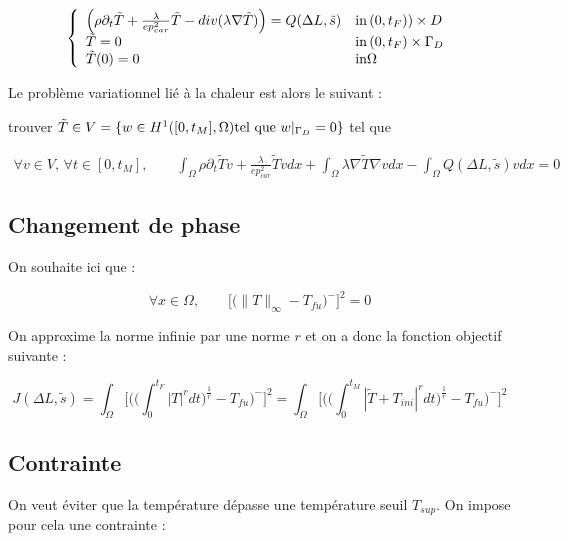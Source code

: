 \documentclass[11pt,a4paper]{article}
\begin{document}
\begin{equation}
\label{eq:ChaleurTilde}
\left\{\begin{array}{ll}
\Big(\rho\partial_t \tilde{T}+\frac{\lambda}{ep_{car}^2} \tilde{T}-div(\lambda\nabla \tilde{T})\Big)=Q(\Delta L,\tilde{s})& \textrm{in\,}(0,t_F))\times D \\
\tilde{T}=0 & \textrm{in\,}(0,t_F)\times \Gamma_D \\
\tilde{T}(0)=0 & \textrm{in} \Omega
\end{array}\right.
\end{equation}




Le problème variationnel lié à la chaleur est alors le suivant :

trouver $\tilde{T}\in V=\{w\in H^1([0,t_M],\Omega) \textrm{tel\,\,que} \,\,w|_{\Gamma_D}=0\}$ tel que

\begin{equation}
\label{eq:pbVarChaleurTF}
\begin{aligned}
\forall v\in V,\,\forall t\in[0,t_M], \qquad\int_{\Omega}\rho\partial_t \tilde{T}v+\frac{\lambda}{ep_{car}^2} \tilde{T}v dx+\int_{\Omega}\lambda\nabla \tilde{T}\nabla vdx-\int_{\Omega}Q(\Delta L,\tilde{s})vdx=0
\end{aligned} 
\end{equation}

\subsection*{Changement de phase}
On souhaite ici que :

\begin{equation}
\forall x\in\Omega,\qquad \Big[\Big(\|T\|_{\infty}-T_{fu}\Big)^-\Big]^2=0
\end{equation}

On approxime la norme infinie par une norme $r$ et on a donc la fonction objectif suivante :

\begin{equation}
J(\Delta L,\tilde{s})=\int_{\Omega}\Bigg[\Bigg(\Big(\int_{0}^{t_F}|T|^rdt\Big)^{\frac{1}{r}}-T_{fu}\Bigg)^-\Bigg]^2=\int_{\Omega}\Bigg[\Bigg(\Big(\int_{0}^{t_M}|\tilde{T}+T_{ini}|^rdt\Big)^{\frac{1}{r}}-T_{fu}\Bigg)^-\Bigg]^2
\end{equation}

\subsection*{Contrainte}
On veut éviter que la température dépasse une température seuil $T_{sup}$. On impose pour cela une contrainte :
\end{document}

